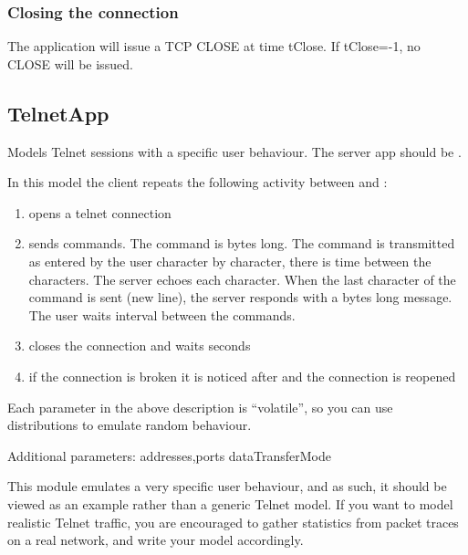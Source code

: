 \subsubsection*{Closing the connection}

The application will issue a TCP CLOSE at time tClose. If tClose=-1, no
CLOSE will be issued.



\subsection{TelnetApp}

Models Telnet sessions with a specific user behaviour.
The server app should be .

In this model the client repeats the following activity
between  and :

\begin{enumerate}
\item opens a telnet connection
\item sends  commands. The command is  bytes
      long. The command is transmitted as entered by the user character by character,
      there is  time between the characters. The server echoes
      each character. When the last character of the command is sent (new line),
      the server responds with a  bytes long message.
      The user waits  interval between the commands.
\item closes the connection and waits  seconds
\item if the connection is broken it is noticed after 
      and the connection is reopened
\end{enumerate}

Each parameter in the above description is ``volatile'', so you can
use distributions to emulate random behaviour.

Additional parameters:
addresses,ports
dataTransferMode

\begin{note}
This module emulates a very specific user behaviour, and as such,
it should be viewed as an example rather than a generic Telnet model.
If you want to model realistic Telnet traffic, you are encouraged
to gather statistics from packet traces on a real network, and
write your model accordingly.
\end{note}

